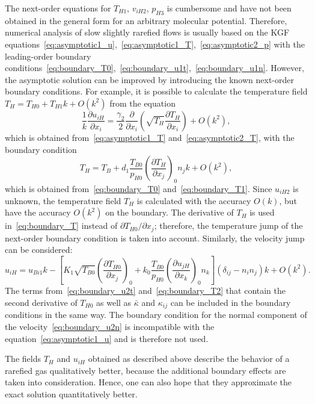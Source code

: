\documentclass[10pt]{article}
\newcommand{\pder}[2][]{\frac{\partial#1}{\partial#2}}
\newcommand{\Pder}[2][]{\partial#1/\partial#2}
\newcommand{\deltann}[2]{(\delta_{#1#2}-n_#1 n_#2)}
\newcommand{\OO}[1]{O(#1)}
\newcommand{\onwall}[1]{\left(#1\right)_0}
\begin{document}
The next-order equations for \(T_{H1}\), \(v_{iH2}\), \(p_{H3}\) is cumbersome and
have not been obtained in the general form for an arbitrary molecular potential.
Therefore, numerical analysis of slow slightly rarefied flows is usually based on
the KGF equations~\eqref{eq:asymptotic1_u},~\eqref{eq:asymptotic1_T},~\eqref{eq:asymptotic2_p}
with the leading-order boundary conditions~\eqref{eq:boundary_T0},~\eqref{eq:boundary_u1t},~\eqref{eq:boundary_u1n}.
However, the asymptotic solution can be improved by introducing the known next-order boundary conditions.
For example, it is possible to calculate the temperature field \(T_H = T_{H0} + T_{H1}k + \OO{k^2}\) from the equation
\begin{equation}\label{eq:asymptotic_T}
    \frac1k\pder[u_{iH}]{x_i} = \frac{\gamma_2}2\pder{x_i}\left(\sqrt{T_H}\pder[T_H]{x_i}\right) + \OO{k^2},
\end{equation}
which is obtained from~\eqref{eq:asymptotic1_T} and~\eqref{eq:asymptotic2_T}, with the boundary condition
\begin{equation}\label{eq:boundary_T}
    T_H = T_B + d_1\frac{T_{B0}}{p_{H0}}\onwall{\pder[T_H]{x_j}}n_j k + \OO{k^2},
\end{equation}
which is obtained from~\eqref{eq:boundary_T0} and~\eqref{eq:boundary_T1}.
Since \(u_{iH2}\) is unknown, the temperature field \(T_H\) is calculated with the accuracy \(\OO{k}\),
but have the accuracy \(\OO{k^2}\) on the boundary.
The derivative of \(T_H\) is used in~\eqref{eq:boundary_T} instead of \(\Pder[T_{H0}]{x_j}\);
therefore, the temperature jump of the next-order boundary condition is taken into account.
Similarly, the velocity jump can be considered:
\begin{equation}\label{eq:boundary_u}
    u_{iH} = u_{Bi1}k - \left[ K_1\sqrt{T_{B0}}\onwall{\pder[T_{H0}]{x_j}}
        + k_0\frac{T_{B0}}{p_{H0}}\onwall{\pder[u_{jH}]{x_k}}n_k \right] \deltann{i}{j}k + \OO{k^2}.
\end{equation}
The terms from~\eqref{eq:boundary_u2t} and~\eqref{eq:boundary_T2}
that contain the second derivative of \(T_{H0}\) as well as \(\bar\kappa\) and \(\kappa_{ij}\)
can be included in the boundary conditions in the same way.
The boundary condition for the normal component of the velocity~\eqref{eq:boundary_u2n}
is incompatible with the equation~\eqref{eq:asymptotic1_u} and is therefore not used.

The fields \(T_H\) and \(u_{iH}\) obtained as described above describe the behavior of a rarefied gas
qualitatively better, because the additional boundary effects are taken into consideration.
Hence, one can also hope that they approximate the exact solution quantitatively better.
\end{document}
